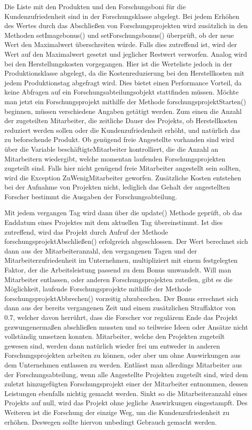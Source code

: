 Die Liste mit den Produkten und den Forschungsboni für die Kundenzufriedenheit sind in der Forschungsklasse abgelegt. Bei jedem Erhöhen des Wertes durch das Abschließen von Forschungsprojekten wird zusätzlich in den Methoden setImagebonus() und setForschungsbonus() überprüft, ob der neue Wert den Maximalwert überschreiten würde. Falls dies zutreffend ist, wird der Wert auf den Maximalwert gesetzt und jeglicher Restwert verworfen.
Analog wird bei den Herstellungskosten vorgegangen. Hier ist die Werteliste jedoch in der Produktionsklasse abgelegt, da die Kostenreduzierung bei den Herstellkosten mit jedem Produktionstag abgefragt wird. Dies bietet einen Performance Vorteil, da keine Abfragen auf ein Forschungsabteilungsobjekt stattfinden müssen.
 Möchte man jetzt ein Forschungsprojekt mithilfe der Methode forschungsprojektStarten() beginnen, müssen verschiedene Angaben getätigt werden. Zum einen die Anzahl der zugeteilten Mitarbeiter, die zeitliche Dauer des Projekts, ob Herstellkosten reduziert werden sollen oder die Kundenzufriedenheit erhöht, und natürlich das zu beforschende Produkt.
Ob genügend freie Angestellte vorhanden sind wird über die Variable beschäftigteMitarbeiter kontrolliert, die die Anzahl an Mitarbeitern wiedergibt, welche momentan laufenden Forschungsprojekten zugeteilt sind. Falls hier nicht genügend freie Mitarbeiter angestellt sein sollten, wird die Exception ZuWenigMitarbeiter geworfen.
Zusätzliche Kosten entstehen bei der Aufnahme von Projekten nicht, lediglich das Gehalt der angestellten Forscher bestimmt die Ausgaben der Forschungsabteilung.

 Mit jedem vergangen Tag wird dann über die update() Methode geprüft, ob das Enddatum eines Projektes mit dem aktuellen Tag übereinstimmt. Ist dies zutreffend, wird das Projekt durch Aufruf der Methode forschungsprojektAbschließen() erfolgreich abgeschlossen. Der Wert berechnet sich dann aus der Mitarbeiteranzahl, den vergangenen Tagen und der Mitarbeiterzufriedenheit im Unternehmen, multipliziert mit einem festgelegten Faktor, der die Arbeitsleistung passend zu dem Bonus umwandelt.
 Will man Mitarbeiter entlassen, oder anderen Forschungsprojekten zuteilen, gibt es die Möglichkeit, laufende Forschungsprojekte mithilfe der Methode forschungsprojektAbbrechen() vorzeitig abzubrechen. Der Bonus errechnet sich dann aus der bereits vergangenen Zeit und einem zusätzlichen Straffaktor von 0.7, welcher davon herrührt, dass die Forscher vor regulärem Ende das Projekt gezwungenermaßen abschließen mussten und so teilweise Ideen oder Ansätze nicht vollständig umsetzen konnten.
Mitarbeiter, welche den Projekten zugeteilt gewesen sind, werden dann natürlich wieder frei um entweder in anderen Forschungsprojekten arbeiten zu können, oder aber um ohne Auswirkungen aus dem Unternehmen entlassen zu werden.
 Entlässt man allerdings Mitarbeiter aus der Forschungsabteilung, wenn alle Angestellte Projekten zugeteilt sind, wird dem zuletzt hinzugefügten Forschungsprojekt einer der Mitarbeiter entnommen, dessen Leistungen ebenfalls nichtig gemacht werden. Sinkt so die Mitarbeiteranzahl eines Projekts auf null, wird das Projekt ohne jegliche Auswirkungen eingestampft.
 Des Weiteren ist die Forschung der einzige Weg, um die Kundenzufriedenheit zu erhöhen. Deswegen sollte hiervon unbedingt Gebrauch gemacht werden.

